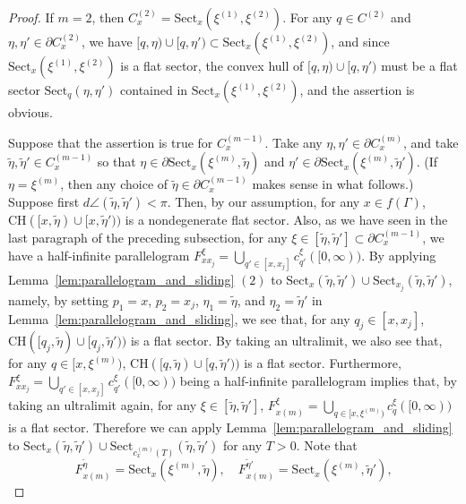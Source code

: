 \documentclass[12pt]{amsart}
\numberwithin{equation}{section}
\theoremstyle{plain}
\theoremstyle{definition}
\theoremstyle{remark}
\newcommand{\xxi}[1]{\xi^{(#1)}}
\newcommand{\ray}[1]{[#1)}
\newcommand{\cc}[2]{c_{#1}^{#2}}
\newcommand{\ch}[1]{\mathrm{CH}(#1)}
\newcommand{\sect}[3][]{\mathrm{Sect}_{#1}(#2,#3)}
\newcommand{\cone}[2][]{C_{#1}^{(#2)}}
\begin{document}
\begin{proof}
 If $m=2$, then 
 $C_{x}^{(2)}=\sect[x]{\xxi{1}}{\xxi{2}}$. 
 For any $q \in C^{(2)}$ and $\eta, \eta' \in \partial C_{x}^{(2)}$, 
 we have
 $\ray{q,\eta}\cup \ray{q,\eta'} \subset
 \sect[x]{\xxi{1}}{\xxi{2}}$, 
 and since $\sect[x]{\xxi{1}}{\xxi{2}}$ is a flat sector, the convex
 hull of $\ray{q,\eta}\cup \ray{q,\eta'}$ must be a flat sector 
 $\sect[q]{\eta}{\eta'}$ contained in $\sect[x]{\xxi{1}}{\xxi{2}}$, 
 and the assertion is obvious.

 Suppose that the assertion is true for $\cone[x]{m-1}$.
 Take any $\eta, \eta' \in \partial \cone[x]{m}$, and take 
 $\tilde\eta, \tilde\eta' \in \cone[x]{m-1}$ so that
 $\eta \in \partial \sect[x]{\xxi{m}}{\tilde \eta}$ and 
 $\eta' \in \partial \sect[x]{\xxi{m}}{\tilde \eta'}$. 
 (If $\eta=\xxi{m}$, then any choice of 
 $\tilde\eta \in \partial \cone[x]{m-1}$ makes sense in what follows.)
 Suppose first $d{\angle}(\tilde\eta,\tilde\eta')<\pi$.
 Then, by our assumption, for any $x \in f(\Gamma)$, 
 $\ch{\ray{x,\tilde\eta}\cup\ray{x,\tilde\eta'}}$ is a nondegenerate
 flat sector. 
 Also, as we have seen in the last paragraph of the preceding
 subsection, for any 
 $\xi \in [\tilde\eta,\tilde\eta']\subset \partial \cone[x]{m-1}$, 
 we have a half-infinite parallelogram 
 $F_{xx_j}^{\xi}=\bigcup_{q' \in [x,x_j]}\cc{q'}{\xi}(\ray{0,\infty})$. 
 By applying Lemma~\ref{lem:parallelogram_and_sliding} $(2)$ to
 $\sect[x]{\tilde\eta}{\tilde\eta'}\cup\sect[x_j]{\tilde\eta}{\tilde\eta'}$, 
 namely, by setting $p_1=x$, $p_2=x_j$, $\eta_1=\tilde\eta$, and
 $\eta_2=\tilde\eta'$ in Lemma~\ref{lem:parallelogram_and_sliding}, 
 we see that, for any $q_j \in [x,x_j]$, 
 $\ch{\ray{q_j,\tilde\eta}\cup \ray{q_j,\tilde\eta'}}$ is a flat sector. 
 By taking an ultralimit, we also see that, 
 for any  $q \in \ray{x,\xxi{m}}$, 
 $\ch{\ray{q,\tilde\eta}\cup \ray{q,\tilde\eta'}}$ is a flat sector. 
 Furthermore, 
 $F_{xx_j}^{\xi}=\bigcup_{q' \in [x,x_j]}\cc{q'}{\xi}(\ray{0,\infty})$
 being a half-infinite parallelogram implies that,  
 by taking an ultralimit again, 
 for any $\xi \in [\tilde\eta,\tilde\eta']$, 
 $F_{x(m)}^{\xi}=
 \bigcup_{q \in \ray{x,\xxi{m}}}\cc{q}{\xi}(\ray{0,\infty})$ 
 is a flat sector. 
 Therefore we can apply Lemma~\ref{lem:parallelogram_and_sliding} to 
 $\sect[x]{\tilde\eta}{\tilde\eta'} \cup 
 \sect[\cc{x}{(m)}(T)]{\tilde\eta}{\tilde\eta'}$
 for any $T>0$. 
 Note that 
\begin{equation*}
  F_{x (m)}^{\tilde\eta}=\sect[x]{\xxi{m}}{\tilde\eta}, 
   \quad
 F_{x (m)}^{\tilde\eta'}= \sect[x]{\xxi{m}}{\tilde\eta'}, 

\end{equation*}
\end{proof}
\end{document}

